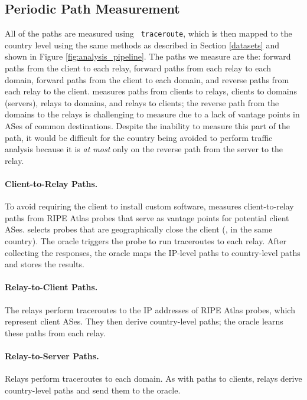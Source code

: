 \subsection{Periodic Path Measurement}

All of the paths are measured using {\tt 
traceroute}, which is then mapped to the country level using the same methods as 
described in Section \ref{datasets} and shown in Figure 
\ref{fig:analysis_pipeline}.  The paths we measure are the: forward paths from 
the client to each relay, forward paths from each relay to each domain, forward 
paths from the client to each domain, and reverse paths from each relay to the 
client. 
\system{} measures paths from clients to relays, clients to domains (servers),
relays to domains, and relays to clients; the reverse path from the domains to the relays 
is challenging to measure due to a lack of vantage points in ASes of
common destinations.  
Despite the inability to measure this part of the
path, it would be difficult for the country being avoided to perform
traffic analysis because it is {\it at most} only on the reverse path 
from the server to the relay. 


\paragraph{Client-to-Relay Paths.} 
To avoid requiring the client to install custom software, \system{}
measures client-to-relay paths from RIPE Atlas probes that serve as 
vantage points for potential client ASes.  \system{} selects probes that
are geographically close the client (\eg, in the same 
country). The oracle triggers the probe to run traceroutes
to each relay.  After collecting the responses, the oracle maps 
the IP-level paths to country-level paths and stores the results.

\paragraph{Relay-to-Client Paths.} The relays perform
traceroutes to the IP addresses of RIPE Atlas probes, which 
represent client ASes.  They then derive country-level paths; the
oracle learns these paths from each relay.  

\paragraph{Relay-to-Server Paths.} Relays perform 
traceroutes to each domain.  As with paths to clients,
relays derive country-level paths and send them to the oracle.

